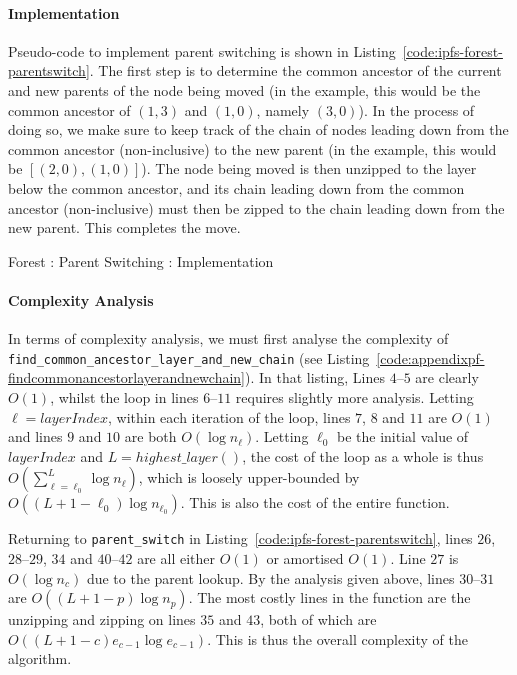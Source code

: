 \paragraph{Implementation}

Pseudo-code to implement parent switching is shown in Listing~\ref{code:ipfs-forest-parentswitch}. The first step is to determine the common ancestor of the current and new parents of the node being moved (in the example, this would be the common ancestor of $(1,3)$ and $(1,0)$, namely $(3,0)$). In the process of doing so, we make sure to keep track of the chain of nodes leading down from the common ancestor (non-inclusive) to the new parent (in the example, this would be $[(2,0), (1,0)]$). The node being moved is then unzipped to the layer below the common ancestor, and its chain leading down from the common ancestor (non-inclusive) must then be zipped to the chain leading down from the new parent. This completes the move.

\begin{stulisting}[p]
\caption{Forest : Parent Switching : Implementation}
\label{code:ipfs-forest-parentswitch}

\end{stulisting}

\paragraph{Complexity Analysis}

In terms of complexity analysis, we must first analyse the complexity of \texttt{find_common_ancestor_layer_and_new_chain} (see Listing~\ref{code:appendixpf-findcommonancestorlayerandnewchain}). In that listing, Lines $4$--$5$ are clearly $O(1)$, whilst the loop in lines $6$--$11$ requires slightly more analysis. Letting $\ell = \mathit{layerIndex}$, within each iteration of the loop, lines $7$, $8$ and $11$ are $O(1)$ and lines $9$ and $10$ are both $O(\log n_\ell)$. Letting $\ell_0$ be the initial value of $\mathit{layerIndex}$ and $L = \mathit{highest\_layer()}$, the cost of the loop as a whole is thus $O(\sum_{\ell=\ell_0}^L \log n_\ell)$, which is loosely upper-bounded by $O((L+1-\ell_0) \log n_{\ell_0})$. This is also the cost of the entire function.

Returning to \texttt{parent_switch} in Listing~\ref{code:ipfs-forest-parentswitch}, lines $26$, $28$--$29$, $34$ and $40$--$42$ are all either $O(1)$ or amortised $O(1)$. Line $27$ is $O(\log n_c)$ due to the parent lookup. By the analysis given above, lines $30$--$31$ are $O((L+1-p) \log n_p)$. The most costly lines in the function are the unzipping and zipping on lines $35$ and $43$, both of which are $O((L+1-c) e_{c-1} \log e_{c-1})$. This is thus the overall complexity of the algorithm.

